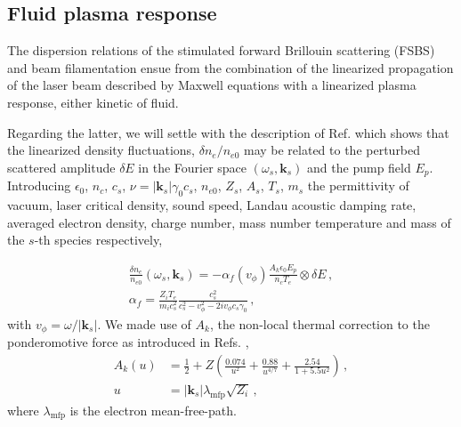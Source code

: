 \documentclass[
 reprint,
 amsmath,amssymb,
 aps,
]{revtex4-1}
\begin{document}
\subsection{Fluid plasma response}
The dispersion relations of the stimulated forward Brillouin scattering (FSBS) and beam filamentation ensue from the combination of the linearized propagation of the laser beam described by  Maxwell equations with a linearized plasma response, either kinetic of fluid. 

Regarding the latter, we will settle with the description of Ref. \cite[]{POP_Ruyer_2021} which shows that the linearized density fluctuations, $\delta n_e /n_{e0}$ may be related to the  perturbed scattered  amplitude $\delta E$ in the Fourier space $(\omega_s,\mathbf{k}_s)$ and the pump field  $E_p$.
Introducing $\epsilon_0$, $n_c$, $c_s$, $\nu=\vert\mathbf{k}_s\vert \gamma_0 c_s$, $n_{e0}$, $Z_s$, $A_s$, $T_{s}$, $m_s$ the permittivity of vacuum, laser critical density, sound speed, Landau acoustic damping rate, averaged electron density, charge number, mass number temperature and mass of the $s$-th species respectively, 

\begin{align}
   \frac{\delta n_e }{n_{e0}}(\omega_s,\mathbf{k}_s) = -\alpha_{f}(v_\phi) \frac{A_k\epsilon_0 E_p}{n_c T_e}\otimes   \delta E  \, ,\label{eq:fd} \\
   \alpha_f = \frac{Z_iT_e}{m_ic_s^2} \frac{ c_s^2}{ c_s^2-v_\phi^2 -2iv_\phi c_s \gamma_0}\, , \label{eq:alphaf}
\end{align}
with $v_\phi = \omega/\vert \mathbf{k}_s\vert$.
We made use of %
$A_k$, the  non-local thermal correction to the ponderomotive force  as introduced in Refs. \cite[]{POP_Kaiser_1993,Bychenkov_2000}, 
\begin{align}
     A_k(u)   &= \frac{1}{2} +Z\left( \frac{0.074}{u^2}+ \frac{0.88}{u^{4/7}} + \frac{2.54}{1+5.5u^2} \right) \, ,\nonumber \\ 
     u &=\vert \mathbf{k}_s \vert\lambda_\mathrm{mfp} \sqrt{Z_i}\label{eq:nl}\, ,
\end{align}
where $\lambda_\mathrm{mfp}$ is the  electron mean-free-path.
\end{document}
